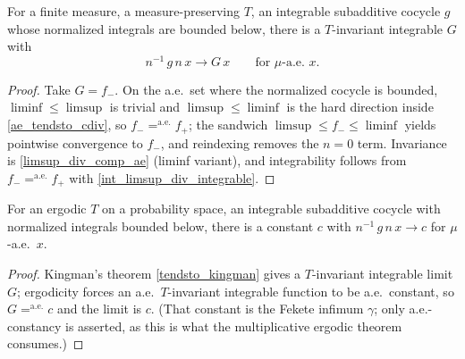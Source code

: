 \begin{theorem}\label{tendsto_kingman}
  \leanok
  For a finite measure, a measure-preserving \(T\), an integrable subadditive
  cocycle \(g\) whose normalized integrals are bounded below, there is a
  \(T\)-invariant integrable \(G\) with
  \[
    n^{-1}\, g\,n\,x \to G\,x
      \qquad \text{for } \mu\text{-a.e.\ } x.
  \]
\end{theorem}
\begin{proof}\leanok
  Take \(G = f_-\). On the a.e.\ set where the normalized cocycle is bounded,
  \(\liminf \le \limsup\) is trivial and \(\limsup \le \liminf\) is the hard
  direction inside \cref{ae_tendsto_cdiv}, so \(f_- =^{\text{a.e.}} f_+\); the
  sandwich \(\limsup \le f_- \le \liminf\) yields pointwise convergence to
  \(f_-\), and reindexing removes the \(n=0\) term. Invariance is
  \cref{limsup_div_comp_ae} (liminf variant), and integrability follows from
  \(f_- =^{\text{a.e.}} f_+\) with \cref{int_limsup_div_integrable}.
\end{proof}

\begin{corollary}\label{tendsto_kingman_ergodic}
  \leanok
  For an ergodic \(T\) on a probability space, an integrable subadditive cocycle
  with normalized integrals bounded below, there is a constant \(c\) with
  \(n^{-1}\,g\,n\,x \to c\) for \(\mu\)-a.e.\ \(x\).
\end{corollary}
\begin{proof}\leanok
  Kingman's theorem \cref{tendsto_kingman} gives a \(T\)-invariant integrable
  limit \(G\); ergodicity forces an a.e.\ \(T\)-invariant integrable function to
  be a.e.\ constant, so \(G =^{\text{a.e.}} c\) and the limit is \(c\). (That
  constant is the Fekete infimum \(\gamma\); only a.e.-constancy is asserted, as
  this is what the multiplicative ergodic theorem consumes.)
\end{proof}
